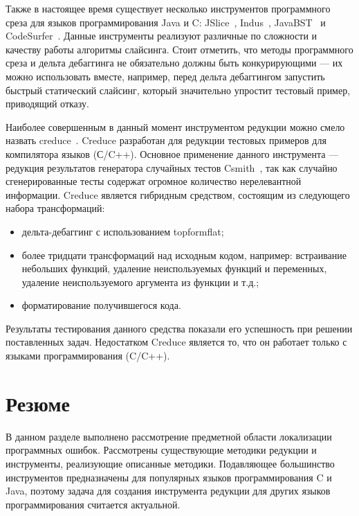 Также в настоящее время существует несколько инструментов программного среза для языков программирования Java и C: JSlice~\cite{WR:04}, Indus~\cite{jayaraman2005kaveri}, JavaBST~\cite{abdallah2017javabst} и CodeSurfer~\cite{anderson2004codesurfer}. Данные инструменты реализуют различные по сложности и качеству работы алгоритмы слайсинга. Стоит отметить, что методы программного среза и дельта дебаггинга не обязательно должны быть конкурирующими --- их можно использовать вместе, например, перед дельта дебаггингом запустить быстрый статический слайсинг, который значительно упростит тестовый пример, приводящий отказу.


Наиболее совершенным в данный момент инструментом редукции можно смело назвать creduce~\cite{regehr2012test}. Creduce разработан для редукции тестовых примеров для компилятора языков (С/C++). Основное применение данного инструмента --- редукция результатов генератора случайных тестов Csmith~\cite{yang2011finding}, так как случайно сгенерированные тесты содержат огромное количество нерелевантной информации. Creduce является гибридным средством, состоящим из следующего набора трансформаций:
\begin{itemize}
	\item дельта-дебаггинг с использованием topformflat;
	\item более тридцати трансформаций над исходным кодом, например: встраивание небольших функций, удаление неиспользуемых функций и переменных, удаление неиспользуемого аргумента из функции и т.д.;
	\item форматирование получившегося кода.
\end{itemize}
Результаты тестирования данного средства показали его успешность при решении поставленных задач. Недостатком Creduce является то, что он работает только с языками программирования (C/C++).

\section{Резюме}
В данном разделе выполнено рассмотрение предметной области локализации программных ошибок. Рассмотрены существу­ющие методики редукции и инструменты, реализующие описанные методики. Подавляющее большинство инструментов предназначены для популярных языков программирования C и Java, поэтому задача для создания инструмента редукции для других языков программирования считается актуальной.